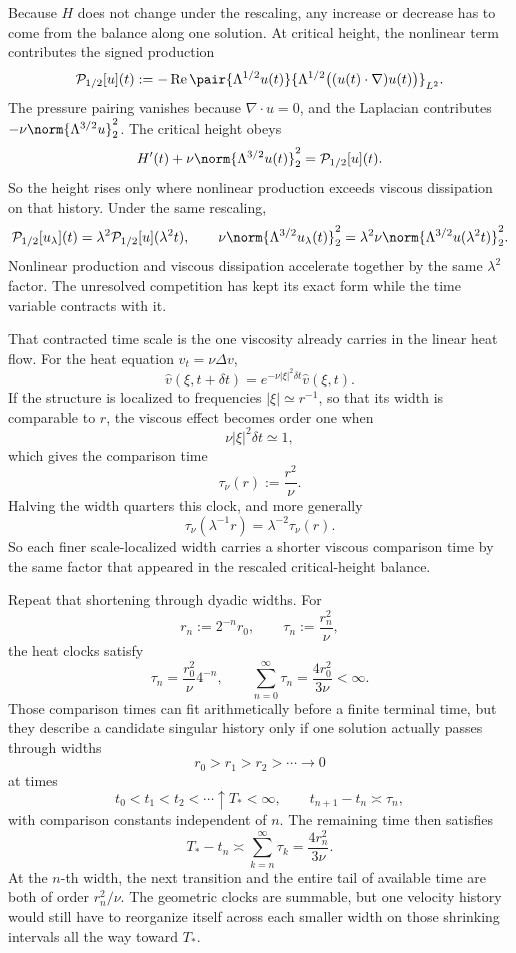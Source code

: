 
Because \(H\) does not change under the rescaling, any increase or decrease has to come from the balance along one solution. At critical height, the nonlinear term contributes the signed production
\[
  \mathcal P_{1/2}[u](t)
  :=
  -\operatorname{Re}
  \pair
    {\Lambda^{1/2}u(t)}
    {\Lambda^{1/2}\bigl((u(t)\cdot\nabla)u(t)\bigr)}_{L^2}.
\]
The pressure pairing vanishes because \(\nabla\cdot u=0\), and the Laplacian contributes \(-\nu\norm{\Lambda^{3/2}u}_2^2\). The critical height obeys
\[
  H'(t)
  +
  \nu\norm{\Lambda^{3/2}u(t)}_2^2
  =
  \mathcal P_{1/2}[u](t).
\]
So the height rises only where nonlinear production exceeds viscous dissipation on that history. Under the same rescaling,
\[
  \mathcal P_{1/2}[u_\lambda](t)
  =
  \lambda^2\mathcal P_{1/2}[u](\lambda^2t),
  \qquad
  \nu\norm{\Lambda^{3/2}u_\lambda(t)}_2^2
  =
  \lambda^2\nu\norm{\Lambda^{3/2}u(\lambda^2t)}_2^2.
\]
Nonlinear production and viscous dissipation accelerate together by the same \(\lambda^2\) factor. The unresolved competition has kept its exact form while the time variable contracts with it.


That contracted time scale is the one viscosity already carries in the linear heat flow. For the heat equation \(v_t=\nu\Delta v\),
\[
  \widehat v(\xi,t+\delta t)
  =
  e^{-\nu|\xi|^2\delta t}\widehat v(\xi,t).
\]
If the structure is localized to frequencies \(|\xi|\simeq r^{-1}\), so that its width is comparable to \(r\), the viscous effect becomes order one when
\[
  \nu|\xi|^2\delta t\simeq1,
\]
which gives the comparison time
\[
  \tau_\nu(r)
  :=
  \frac{r^2}{\nu}.
\]
Halving the width quarters this clock, and more generally
\[
  \tau_\nu(\lambda^{-1}r)
  =
  \lambda^{-2}\tau_\nu(r).
\]
So each finer scale-localized width carries a shorter viscous comparison time by the same factor that appeared in the rescaled critical-height balance.


Repeat that shortening through dyadic widths. For
\[
  r_n:=2^{-n}r_0,
  \qquad
  \tau_n:=\frac{r_n^2}{\nu},
\]
the heat clocks satisfy
\[
  \tau_n
  =
  \frac{r_0^2}{\nu}4^{-n},
  \qquad
  \sum_{n=0}^{\infty}\tau_n
  =
  \frac{4r_0^2}{3\nu}
  <
  \infty.
\]
Those comparison times can fit arithmetically before a finite terminal time, but they describe a candidate singular history only if one \NavierStokes{} solution actually passes through widths
\[
  r_0>r_1>r_2>\cdots\longrightarrow0
\]
at times
\[
  t_0<t_1<t_2<\cdots\uparrow T_*<\infty,
  \qquad
  t_{n+1}-t_n\asymp\tau_n,
\]
with comparison constants independent of \(n\). The remaining time then satisfies
\[
  T_*-t_n
  \asymp
  \sum_{k=n}^{\infty}\tau_k
  =
  \frac{4r_n^2}{3\nu}.
\]
At the \(n\)-th width, the next transition and the entire tail of available time are both of order \(r_n^2/\nu\). The geometric clocks are summable, but one velocity history would still have to reorganize itself across each smaller width on those shrinking intervals all the way toward \(T_*\).
